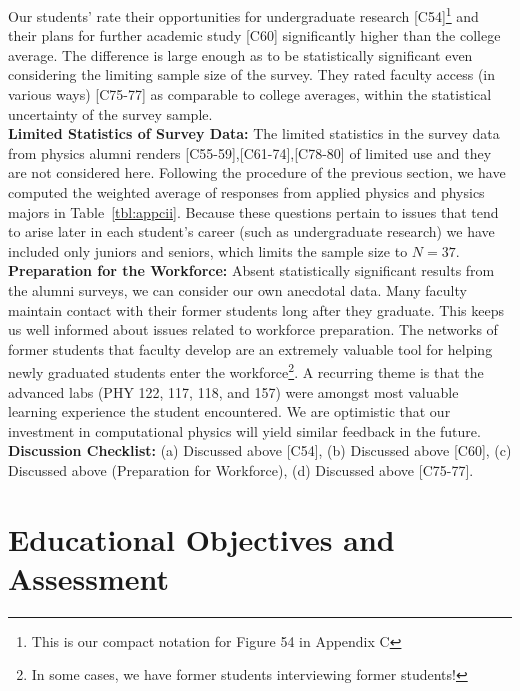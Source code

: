 \documentclass[12pt]{article}
\begin{document}
\noindent
Our students' rate their opportunities for undergraduate research
[C54]\footnote{This is our compact notation for Figure 54 in Appendix C}
 and their plans for further academic study [C60] significantly 
higher than the college average.  The difference is
large enough as to be statistically significant even considering the
limiting sample size of the survey.  They rated faculty access (in
various ways) [C75-77] as comparable to college averages, within the
statistical uncertainty of the survey sample.\\[3pt]

\noindent
{\bf Limited Statistics of Survey Data:} The limited statistics in the
survey data from physics alumni renders [C55-59],[C61-74],[C78-80] of
limited use and they are not considered here.  Following the procedure
of the previous section, we have computed the weighted average of
responses from applied physics and physics majors in
Table~\ref{tbl:appcii}.  Because these questions pertain to issues
that tend to arise later in each student's career (such as undergraduate
research) we have included only juniors and seniors, which limits the
sample size to $N=37$.\\[3pt]

\noindent
{\bf Preparation for the Workforce:} Absent statistically significant
results from the alumni surveys, we can consider our own anecdotal
data.  Many faculty maintain contact with their former students long
after they graduate.  This keeps us well informed about issues related
to workforce preparation.  The networks of former students that
faculty develop are an extremely valuable tool for helping newly
graduated students enter the workforce\footnote{In some cases, we have
  former students interviewing former students!}.  A recurring theme
is that the advanced labs (PHY 122, 117, 118, and 157) were amongst most
valuable learning experience the student encountered.  We are
optimistic that our investment in computational physics will yield
similar feedback in the future.\\[3pt]

\noindent
{\bf Discussion Checklist:} (a) Discussed above [C54], (b) Discussed
above [C60], (c) Discussed above (Preparation for Workforce), (d)
Discussed above [C75-77].

\newpage
\section{Educational Objectives and Assessment}
\end{document}
